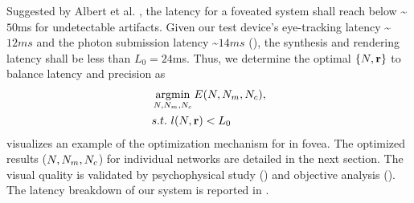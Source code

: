 Suggested by Albert et al. , the latency for a foveated system shall reach below \textasciitilde$50$ms for undetectable artifacts. Given our test device's eye-tracking latency \textasciitilde$12ms$ and the photon submission latency \textasciitilde$14ms$ (\cite{albert2017latency}), the synthesis and rendering latency shall be less than $L_0 = 24$ms.
Thus, we determine the optimal $\{N, \mathbf{r}\}$ to balance latency and precision as
\begin{equation}
\begin{aligned}
    &\argmin_{\sphereNum, \mlpLayerNum, \mlpChannelNum} \finalError(\sphereNum, \mlpLayerNum, \mlpChannelNum), \\
    & s.t.\ {l(\sphereNum, \mathbf{\sphereRadius})} < L_0
\end{aligned}
\end{equation}
 visualizes an example of the optimization mechanism for in fovea. The optimized results ($N, N_{m}, N_{c}$) for individual networks are detailed in the next section. The visual quality is validated by psychophysical study () and objective analysis (). The latency breakdown of our system is reported in .

